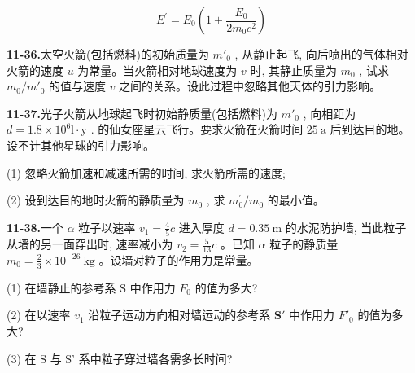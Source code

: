 $$
E ^ {\prime} = E _ {0} \left(1 + \frac {E _ {0}}{2 m _ {0} c ^ {2}}\right)
$$

\vfill\newpage

\textbf{11-36.}太空火箭(包括燃料)的初始质量为 $m'_{0}$ , 从静止起飞, 向后喷出的气体相对火箭的速度 $u$ 为常量。当火箭相对地球速度为 $v$ 时, 其静止质量为 $m_{0}$ , 试求 $m_{0}/m'_{0}$ 的值与速度 $v$ 之间的关系。设此过程中忽略其他天体的引力影响。

\vfill


\textbf{11-37.}光子火箭从地球起飞时初始静质量(包括燃料)为 $m'_{0}$ , 向相距为 $d = 1.8 \times 10^{6} \mathrm{l} \cdot \mathrm{y}$ . 的仙女座星云飞行。要求火箭在火箭时间 $25 \mathrm{~a}$ 后到达目的地。设不计其他星球的引力影响。

(1) 忽略火箭加速和减速所需的时间, 求火箭所需的速度;

(2) 设到达目的地时火箭的静质量为 $m_{0}$ , 求 $m^{\prime}_{0} / m_{0}$ 的最小值。

\vfill\newpage

\textbf{11-38.}一个 $\alpha$ 粒子以速率 $v_{1} = \frac{4}{5} c$ 进入厚度 $d = 0.35 \mathrm{~m}$ 的水泥防护墙, 当此粒子从墙的另一面穿出时, 速率减小为 $v_{2} = \frac{5}{13} c$ 。已知 $\alpha$ 粒子的静质量 $m_{0} = \frac{2}{3} \times 10^{-26} \mathrm{~kg}$ 。设墙对粒子的作用力是常量。

(1) 在墙静止的参考系 S 中作用力 $F_{0}$ 的值为多大?

(2) 在以速率 $v_{1}$ 沿粒子运动方向相对墙运动的参考系 $\mathbf{S}'$ 中作用力 $F'_{0}$ 的值为多大?

(3) 在 S 与 S' 系中粒子穿过墙各需多长时间?


\vfill
\newpage